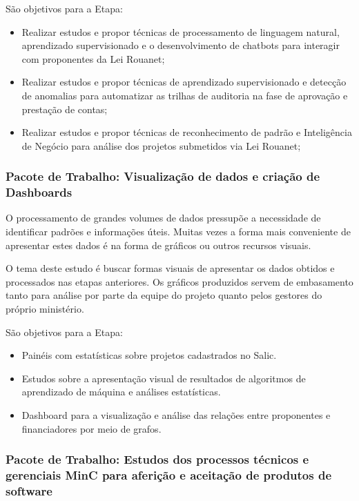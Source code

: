 São objetivos para a Etapa:

\begin{itemize}
 \item Realizar estudos e propor técnicas de processamento de linguagem natural, 
  aprendizado supervisionado e o desenvolvimento de chatbots para interagir
  com proponentes da Lei Rouanet;
 \item Realizar estudos e propor técnicas de aprendizado supervisionado e 
  detecção de anomalias para automatizar as trilhas de auditoria na fase de 
  aprovação e prestação de contas;
 \item Realizar estudos e propor técnicas de reconhecimento de padrão e 
  Inteligência de Negócio para análise dos projetos submetidos via Lei Rouanet;
\end{itemize}


\subsubsection{Pacote de Trabalho: Visualização de dados e criação de Dashboards}

O processamento de grandes volumes de dados pressupõe a necessidade de identificar
padrões e informações úteis. Muitas vezes a forma mais conveniente de apresentar
estes dados é na forma de gráficos ou outros recursos visuais.

O tema deste estudo é buscar formas visuais de apresentar os dados obtidos e 
processados nas etapas anteriores. Os gráficos produzidos servem de embasamento
tanto para análise por parte da equipe do projeto quanto pelos gestores do próprio
ministério.

São objetivos para a Etapa:

\begin{itemize}
 \item Painéis com estatísticas sobre projetos cadastrados no Salic.
 \item Estudos sobre a apresentação visual de resultados de algoritmos de aprendizado
  de máquina e análises estatísticas. 
 \item Dashboard  para a visualização e análise das relações entre proponentes 
  e financiadores por meio de grafos.
\end{itemize}


\subsubsection{Pacote de Trabalho: Estudos dos processos técnicos e gerenciais 
MinC para aferição e aceitação de produtos de software}
\label{Sub:etapagerenciais}

